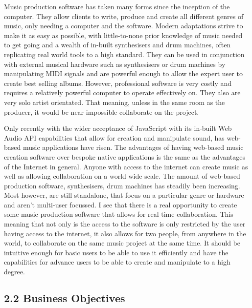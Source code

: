 \documentclass[a4paper]{article}
\begin{document}
Music production software has taken many forms since the inception of the computer. They allow clients to write, produce and create all different genres of music, only needing a computer and the software. Modern adaptations strive to make it as easy as possible, with little-to-none prior knowledge of music needed to get going and a wealth of in-built synthesisers and drum machines, often replicating real world tools to a high standard. They can be used in conjunction with external musical hardware such as synthesisers or drum machines by manipulating MIDI signals and are powerful enough to allow the expert user to create best selling albums. However, professional software is very costly and requires a relatively powerful computer to operate effectively on. They also are very solo artist orientated. That meaning, unless in the same room as the producer, it would be near impossible collaborate on the project. \par

Only recently with the wider acceptance of JavaScript with its in-built Web Audio API capabilities that allow for creation and manipulate sound, has web-based music applications have risen. The advantages of having web-based music creation software over bespoke native applications is the same as the advantages of the Internet in general. Anyone with access to the internet can create music as well as allowing collaboration on a world wide scale. The amount of web-based production software, synthesisers, drum machines has steadily been increasing. Most however, are still standalone, that focus on a particular genre or hardware and aren't multi-user focussed. I see that there is a real opportunity to create some music production software that allows for real-time collaboration. This meaning that not only is the access to the software is only restricted by the user having access to the internet, it also allows for two people, from anywhere in the world, to collaborate on the same music project at the same time. It should be intuitive enough for basic users to be able to use it efficiently and have the capabilities for advance users to be able to create and manipulate to a high degree. \par

\subsection{2.2 Business Objectives}
\end{document}
